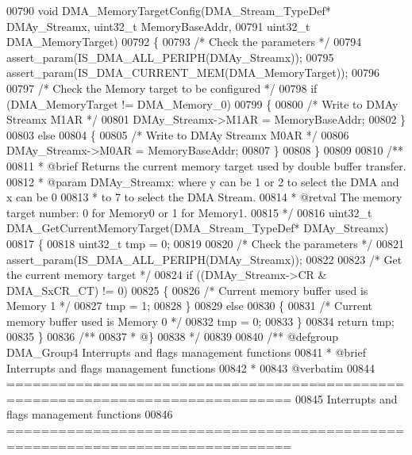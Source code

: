\begin{DoxyCode}
00790 \textcolor{keywordtype}{void} DMA_MemoryTargetConfig(DMA\_Stream\_TypeDef* DMAy\_Streamx, uint32\_t MemoryBaseAddr,
00791                            uint32\_t DMA\_MemoryTarget)
00792 \{
00793   \textcolor{comment}{/* Check the parameters */}
00794   assert_param(IS\_DMA\_ALL\_PERIPH(DMAy\_Streamx));
00795   assert_param(IS\_DMA\_CURRENT\_MEM(DMA\_MemoryTarget));
00796 
00797   \textcolor{comment}{/* Check the Memory target to be configured */}
00798   \textcolor{keywordflow}{if} (DMA\_MemoryTarget != DMA_Memory_0)
00799   \{
00800     \textcolor{comment}{/* Write to DMAy Streamx M1AR */}
00801     DMAy\_Streamx->M1AR = MemoryBaseAddr;
00802   \}
00803   \textcolor{keywordflow}{else}
00804   \{
00805     \textcolor{comment}{/* Write to DMAy Streamx M0AR */}
00806     DMAy\_Streamx->M0AR = MemoryBaseAddr;
00807   \}
00808 \}
00809 
00810 \textcolor{comment}{/**}
00811 \textcolor{comment}{  * @brief  Returns the current memory target used by double buffer transfer.}
00812 \textcolor{comment}{  * @param  DMAy\_Streamx: where y can be 1 or 2 to select the DMA and x can be 0}
00813 \textcolor{comment}{  *          to 7 to select the DMA Stream.}
00814 \textcolor{comment}{  * @retval The memory target number: 0 for Memory0 or 1 for Memory1. }
00815 \textcolor{comment}{  */}
00816 uint32\_t DMA_GetCurrentMemoryTarget(DMA\_Stream\_TypeDef* DMAy\_Streamx)
00817 \{
00818   uint32\_t tmp = 0;
00819 
00820   \textcolor{comment}{/* Check the parameters */}
00821   assert_param(IS\_DMA\_ALL\_PERIPH(DMAy\_Streamx));
00822 
00823   \textcolor{comment}{/* Get the current memory target */}
00824   \textcolor{keywordflow}{if} ((DMAy\_Streamx->CR & DMA_SxCR_CT) != 0)
00825   \{
00826     \textcolor{comment}{/* Current memory buffer used is Memory 1 */}
00827     tmp = 1;
00828   \}
00829   \textcolor{keywordflow}{else}
00830   \{
00831     \textcolor{comment}{/* Current memory buffer used is Memory 0 */}
00832     tmp = 0;
00833   \}
00834   \textcolor{keywordflow}{return} tmp;
00835 \}
00836 \textcolor{comment}{/**}
00837 \textcolor{comment}{  * @\}}
00838 \textcolor{comment}{  */}
00839 
00840 \textcolor{comment}{/** @defgroup DMA\_Group4 Interrupts and flags management functions}
00841 \textcolor{comment}{ *  @brief   Interrupts and flags management functions }
00842 \textcolor{comment}{ *}
00843 \textcolor{comment}{@verbatim   }
00844 \textcolor{comment}{ ===============================================================================}
00845 \textcolor{comment}{                  Interrupts and flags management functions}
00846 \textcolor{comment}{ ===============================================================================  }

\end{DoxyCode}
